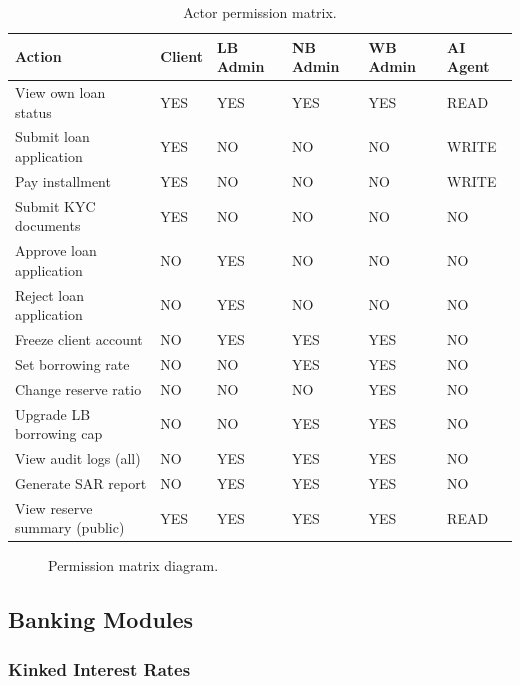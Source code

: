 \begin{table}[H]
\centering
\caption[Actor permission matrix]{Actor permission matrix.}
\label{tab:permission-matrix}
\begin{tabular}{p{4.4cm}p{1.3cm}p{1.5cm}p{1.5cm}p{1.5cm}p{1.6cm}}
\toprule
\tableheadcolor
\textbf{Action} & \textbf{Client} & \textbf{LB Admin} & \textbf{NB Admin} & \textbf{WB Admin} & \textbf{AI Agent} \\
\midrule
View own loan status & YES & YES & YES & YES & READ \\
Submit loan application & YES & NO & NO & NO & WRITE \\
Pay installment & YES & NO & NO & NO & WRITE \\
Submit KYC documents & YES & NO & NO & NO & NO \\
Approve loan application & NO & YES & NO & NO & NO \\
Reject loan application & NO & YES & NO & NO & NO \\
Freeze client account & NO & YES & YES & YES & NO \\
Set borrowing rate & NO & NO & YES & YES & NO \\
Change reserve ratio & NO & NO & NO & YES & NO \\
Upgrade LB borrowing cap & NO & NO & YES & YES & NO \\
View audit logs (all) & NO & YES & YES & YES & NO \\
Generate SAR report & NO & YES & YES & YES & NO \\
View reserve summary (public) & YES & YES & YES & YES & READ \\
\bottomrule
\end{tabular}
\end{table}

\begin{figure}[H]
\centering
{}
\caption[Permission matrix diagram]{Permission matrix diagram.}
\label{fig:permission-matrix}
\end{figure}



\subsection{Banking Modules}
\label{sec:banking-modules}

\subsubsection{Kinked Interest Rates}
\label{sec:kinked-rate}

